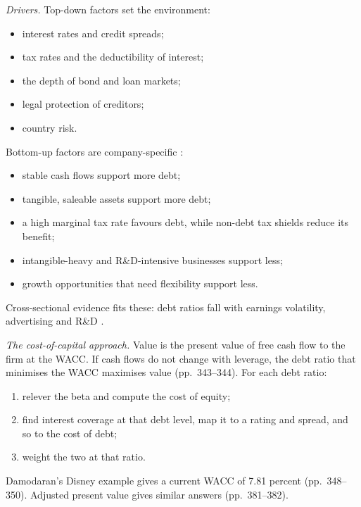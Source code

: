 \begin{qfmethod}\label{meth:capital-structure-benchmarking}
 \emph{Drivers.} Top-down factors set the environment:
\begin{itemize}
\item interest rates and credit spreads;
\item tax rates and the deductibility of interest;
\item the depth of bond and loan markets;
\item legal protection of creditors;
\item country risk.
\end{itemize}
Bottom-up factors are company-specific \citep[pp.~310--319]{applied-corporate-finance-2014}:
\begin{itemize}
\item stable cash flows support more debt;
\item tangible, saleable assets support more debt;
\item a high marginal tax rate favours debt, while non-debt tax shields reduce its benefit;
\item intangible-heavy and R\&D-intensive businesses support less;
\item growth opportunities that need flexibility support less.
\end{itemize}
Cross-sectional evidence fits these: debt ratios fall with earnings volatility, advertising and R\&D \citep[pp.~326--327]{applied-corporate-finance-2014}.

\emph{The cost-of-capital approach.} Value is the present value of free cash flow to the firm at the WACC. If cash flows do not change with leverage, the debt ratio that minimises the WACC maximises value (pp.~343--344). For each debt ratio:
\begin{enumerate}
\item relever the beta and compute the cost of equity;
\item find interest coverage at that debt level, map it to a rating and spread, and so to the cost of debt;
\item weight the two at that ratio.
\end{enumerate}
Damodaran's Disney example gives a current WACC of 7.81 percent (pp.~348--350). Adjusted present value gives similar answers (pp.~381--382).


\end{qfmethod}
